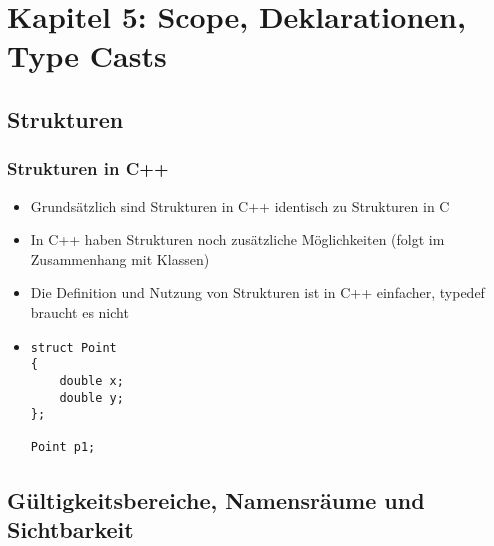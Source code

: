 
\section{Kapitel 5: Scope, Deklarationen, Type Casts\hfill}
\label{sec:abschnitt}


\subsection{Strukturen\hfill}
\label{sec:unterabschnitt}

\subsubsection{Strukturen in C++\hfill}
\label{sec:unterunterabschnitt}
\begin{itemize}
	\item Grundsätzlich sind Strukturen in C++ identisch zu Strukturen in C
	\item In C++ haben Strukturen noch zusätzliche Möglichkeiten (folgt im Zusammenhang mit Klassen)
	\item Die Definition und Nutzung von Strukturen ist in C++ einfacher, typedef braucht es nicht
	\item[\-] 
	\noindent
\begin{minipage}{\linewidth}
\begin{lstlisting}
struct Point
{
	double x;
	double y;		
};
	
Point p1;
\end{lstlisting}
\end{minipage}
\end{itemize}

\subsection{Gültigkeitsbereiche, Namensräume und Sichtbarkeit\hfill}
\label{sec:unterabschnitt}

